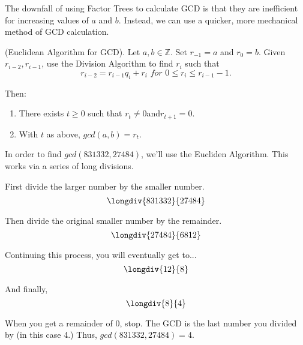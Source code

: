 The downfall of using Factor Trees to calculate GCD is that they are inefficient for increasing values of $a$ and $b$. Instead, we can use a quicker, more mechanical method of GCD calculation.


\begin{theorem}
(Euclidean Algorithm for GCD). 
Let $a, b \in \mathbb{Z}$. 
Set $r_{-1} = a$ and $r_{0} = b$. 
Given $r_{i-2}, r_{i-1}$, use the Division Algorithm to find $r_{i}$ such that 
\[r_{i-2} = r_{i-1}q_{i} + r_{i}\,\,for\,\,0 \leq r_{i} \leq r_{i-1} - 1.\]

Then:
\begin{enumerate}
    \item  There exists $t \geq 0$ such that $r_{t} \neq 0  $and$  r_{t+1} = 0.$
    \item  With $t$ as above, $gcd(a, b) = r_{t}.$
\end{enumerate}
\end{theorem}

\begin{example} In order to find $gcd(831332,27484)$, we'll use the Eucliden Algorithm.  This works via a series of long divisions.

First divide the larger number by the smaller number.
\[
\longdiv{831332}{27484}
\]

 Then divide the original smaller number by the remainder.
\[
\longdiv{27484}{6812}
\]

 Continuing this process, you will eventually get to...
\[
\longdiv{12}{8}
\]
 
 And finally,
\[
\longdiv{8}{4}
\]
 
When you get a remainder of 0, stop. The GCD is the last number you divided by (in this case 4.) 
Thus, $gcd(831332,27484)= 4$.
\end{example}